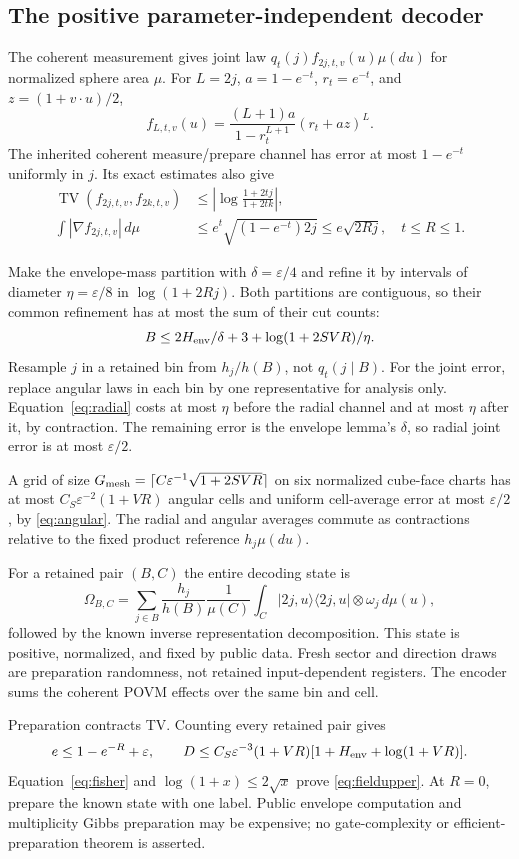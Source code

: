 \documentclass[11pt]{article}
\theoremstyle{definition}
\DeclareMathOperator{\TV}{TV}
\newcommand{\eps}{\varepsilon}
\begin{document}
\subsection{The positive parameter-independent decoder}
The coherent measurement gives joint law
$q_t(j)f_{2j,t,v}(u)\mu(du)$ for normalized sphere area $\mu$.
For $L=2j$, $a=1-e^{-t}$, $r_t=e^{-t}$, and
$z=(1+v\cdot u)/2$,
\[
 f_{L,t,v}(u)=\frac{(L+1)a}{1-r_t^{L+1}}(r_t+az)^L.
\]
The inherited coherent measure/prepare channel has error at most
$1-e^{-t}$ uniformly in $j$. Its exact estimates also give
\begin{align}
 \TV(f_{2j,t,v},f_{2k,t,v})
 &\le\left|\log\frac{1+2tj}{1+2tk}\right|,\label{eq:radial}\\
 \int|\nabla f_{2j,t,v}|\,d\mu
 &\le e^t\sqrt{(1-e^{-t})2j}\le e\sqrt{2Rj},
 \quad t\le R\le1.\label{eq:angular}
\end{align}

Make the envelope-mass partition with $\delta=\eps/4$ and refine it
by intervals of diameter $\eta=\eps/8$ in $\log(1+2Rj)$.
Both partitions are contiguous, so their common refinement has at
most the sum of their cut counts:
\[
 B\le2H_{\rm env}/\delta+3+\log(1+2SVR)/\eta.
\]
Resample $j$ in a retained bin from $h_j/h(B)$, not $q_t(j\mid B)$.
For the joint error, replace angular laws in each bin by one
representative for analysis only. Equation~\eqref{eq:radial} costs
at most $\eta$ before the radial channel and at most $\eta$ after
it, by contraction. The remaining error is the envelope lemma's
$\delta$, so radial joint error is at most $\eps/2$.

A grid of size
$G_{\rm mesh}=\lceil C\eps^{-1}\sqrt{1+2SVR}\rceil$
on six normalized cube-face charts has at most
$C_S\eps^{-2}(1+VR)$ angular cells and uniform cell-average error
at most $\eps/2$, by \eqref{eq:angular}.
The radial and angular averages commute as contractions relative to
the fixed product reference $h_j\mu(du)$.

For a retained pair $(B,C)$ the entire decoding state is
\[
 \Omega_{B,C}=
 \sum_{j\in B}\frac{h_j}{h(B)}\frac1{\mu(C)}
 \int_C|2j,u\rangle\langle2j,u|\otimes\omega_j\,d\mu(u),
\]
followed by the known inverse representation decomposition.
This state is positive, normalized, and fixed by public data.
Fresh sector and direction draws are preparation randomness, not
retained input-dependent registers. The encoder sums the coherent
POVM effects over the same bin and cell.

Preparation contracts TV. Counting every retained pair gives
\[
 e\le1-e^{-R}+\eps,\qquad
 D\le C_S\eps^{-3}(1+VR)
 [1+H_{\rm env}+\log(1+VR)].
\]
Equation~\eqref{eq:fisher} and $\log(1+x)\le2\sqrt x$ prove
\eqref{eq:fieldupper}. At $R=0$, prepare the known state with one
label. Public envelope computation and multiplicity Gibbs preparation
may be expensive; no gate-complexity or efficient-preparation theorem
is asserted.
\end{document}
